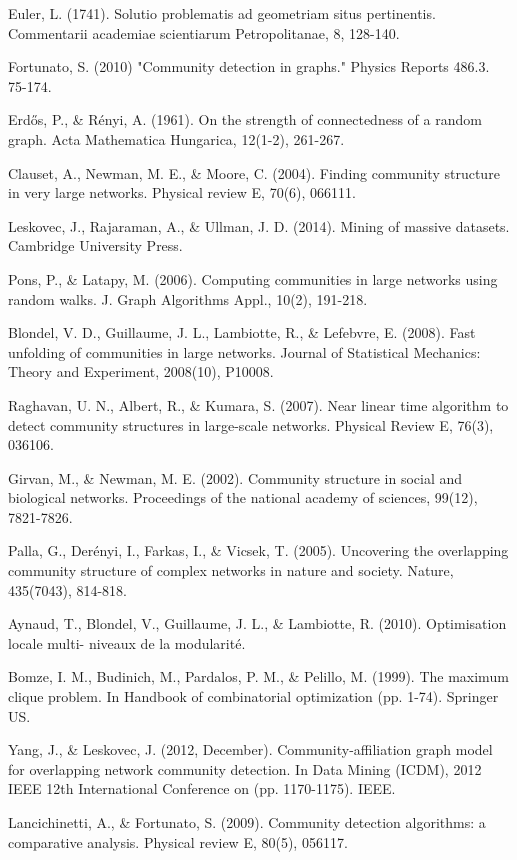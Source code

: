 \documentclass[10pt]{article}
\begin{document}
\begin{thebibliography}{40}

 Euler, L. (1741). Solutio problematis ad geometriam situs pertinentis. Commentarii academiae scientiarum Petropolitanae, 8, 128-140.

 Fortunato, S. (2010) "Community detection in graphs." Physics Reports 486.3. 75-174.

 Erdős, P., \& Rényi, A. (1961). On the strength of connectedness of a random graph. Acta Mathematica Hungarica, 12(1-2), 261-267.

 Clauset, A., Newman, M. E., \& Moore, C. (2004). Finding community structure in very large networks. Physical review E, 70(6), 066111.

 Leskovec, J., Rajaraman, A., \& Ullman, J. D. (2014). Mining of massive datasets. Cambridge University Press.

 Pons, P., \& Latapy, M. (2006). Computing communities in large networks using random walks. J. Graph Algorithms Appl., 10(2), 191-218.

 Blondel, V. D., Guillaume, J. L., Lambiotte, R., \& Lefebvre, E. (2008). Fast unfolding of communities in large networks. Journal of Statistical Mechanics: Theory and Experiment, 2008(10), P10008.

 Raghavan, U. N., Albert, R., \& Kumara, S. (2007). Near linear time algorithm to detect community structures in large-scale networks. Physical Review E, 76(3), 036106.

 Girvan, M., \& Newman, M. E. (2002). Community structure in social and biological networks. Proceedings of the national academy of sciences, 99(12), 7821-7826.

 Palla, G., Derényi, I., Farkas, I., \& Vicsek, T. (2005). Uncovering the overlapping community structure of complex networks in nature and society. Nature, 435(7043), 814-818.

 Aynaud, T., Blondel, V., Guillaume, J. L., \& Lambiotte, R. (2010). Optimisation locale multi- niveaux de la modularité.

 Bomze, I. M., Budinich, M., Pardalos, P. M., \& Pelillo, M. (1999). The maximum clique problem. In Handbook of combinatorial optimization (pp. 1-74). Springer US.

 Yang, J., \& Leskovec, J. (2012, December). Community-affiliation graph model for overlapping network community detection. In Data Mining (ICDM), 2012 IEEE 12th International Conference on (pp. 1170-1175). IEEE.

 Lancichinetti, A., \& Fortunato, S. (2009). Community detection algorithms: a comparative analysis. Physical review E, 80(5), 056117.

\end{thebibliography}
\end{document}
